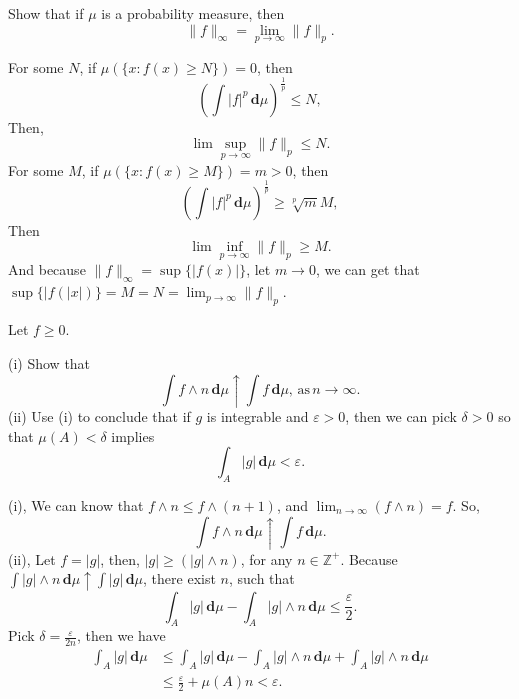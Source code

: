 \documentclass[en, normal, 11pt, black]{elegantnote}
\newenvironment{exercise}[1]{\begin{tcolorbox}[colback=black!15, colframe=black!80, breakable, title=#1]}{\end{tcolorbox}}
\renewenvironment{proof}{\begin{tcolorbox}[colback=white, colframe=black!50, breakable, title=Proof. ]\setlength{\parskip}{0.8em}}{\\\rightline{$\square$}\end{tcolorbox}}
\newcommand{\der}{\,\mathbf{d}}
\begin{document}

    \begin{exercise}{1.5.2}
        Show that if $\mu$ is a probability measure, then
        \[
            \|f\|_{\infty}=\lim_{p\to\infty}\|f\|_p. 
        \]
    \end{exercise}

    \begin{proof}
        For some $N$, if $\mu(\{x:f(x)\geqslant N\})=0$, then
        \[
            \left(\int |f|^p\der\mu\right)^{\frac{1}{p}}\leqslant N, 
        \]
        Then, 
        \[
            \lim\sup_{p\to\infty}\|f\|_p\leqslant N. 
        \]
        For some $M$, if $\mu(\{x:f(x)\geqslant M\})=m>0$, then
        \[
            \left(\int|f|^p\der \mu\right)^{\frac{1}{p}}\geqslant\sqrt[p]{m}M, 
        \]
        Then 
        \[
            \lim\inf_{p\to \infty}\|f\|_p\geqslant M. 
        \]
        And because $\|f\|_\infty=\sup\{|f(x)|\}$, let $m\to0$, we can get that $\sup\{|f(|x|)\}=M=N=\lim_{p\to\infty}\|f\|_p$. 
    \end{proof}


    \begin{exercise}{1.5.7}
        Let $f\geqslant0$. 
        
        (i) Show that
        \[
            \int f\wedge n\der\mu\uparrow\int f\der\mu,\,\text{as}\,n\to\infty. 
        \]
        (ii) Use (i) to conclude that if $g$ is integrable and $\varepsilon>0$, then we can pick $\delta > 0$ so that $\mu(A) < \delta$ implies
        \[
            \int_A|g|\der\mu<\varepsilon. 
        \]
    \end{exercise}

    \begin{proof}
        (i), We can know that $f\wedge n\leqslant f\wedge (n+1)$, and $\lim_{n\to \infty}(f\wedge n)=f$. So, \[\int f\wedge n\der\mu\uparrow\int f\der\mu. \]
        (ii), Let $f=|g|$, then, $|g|\geqslant (|g|\wedge n)$, for any $n\in\mathbb{Z}^+$. Because $\int |g|\wedge n\der\mu\uparrow\int |g|\der\mu$, there exist $n$, such that
        \[
            \int_A |g|\der\mu-\int_A |g|\wedge n\der\mu\leqslant \frac{\varepsilon}{2}. 
        \]
        Pick $\delta=\frac{\varepsilon}{2n}$, then we have
        \begin{align*}
            \int_A|g|\der\mu&\leqslant\int_A|g|\der\mu-\int_A |g|\wedge n\der\mu+\int_A |g|\wedge n\der\mu\\
            &\leqslant\frac{\varepsilon}{2}+\mu(A)n<\varepsilon. 
        \end{align*}
        \vspace{-30pt}
    \end{proof}
\end{document}
